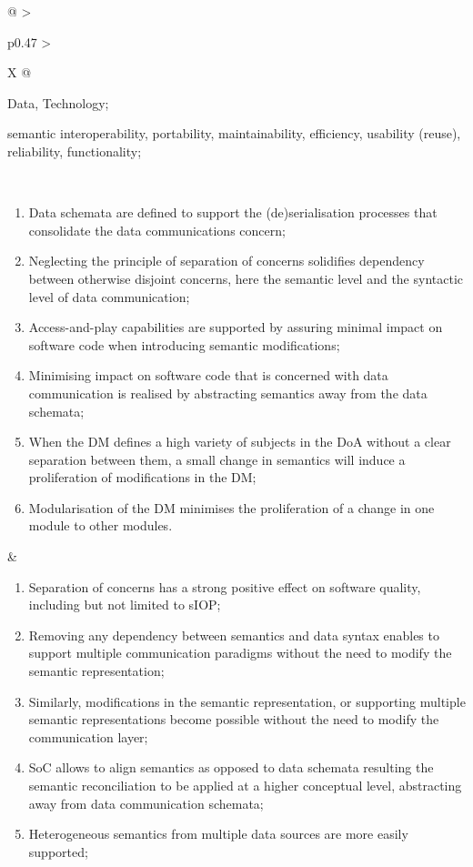\begin{xltabular}[l]{\linewidth}{@{} >{\small\raggedright\arraybackslash}p{0.47\linewidth} >{\small\raggedright\arraybackslash}X @{}}
\begin{description}[labelwidth=3.7cm,leftmargin=3.7cm+1ex,nosep,topsep=2ex,labelsep=1ex,font=\bfseries]
\item[Type of information:] Data, Technology;
\item[Quality attributes:] semantic interoperability, portability, maintainability, efficiency, usability (reuse), reliability, functionality;
\end{description}
\\
\begin{enumerate}[left=6pt, nosep]
  \item Data schemata are defined to support the (de)serialisation processes that consolidate the data communications concern;
  \item Neglecting the principle of separation of concerns solidifies dependency between otherwise disjoint concerns, here the semantic level and the syntactic level of data communication;
  \item Access-and-play capabilities are supported by assuring minimal impact on software code when introducing semantic modifications;
  \item Minimising impact on software code that is concerned with data communication is realised by abstracting semantics away from the data schemata;
  \item When the DM defines a high variety of subjects in the DoA without a clear separation between them, a small change in semantics will induce a proliferation of modifications in the DM;
  \item Modularisation of the DM minimises the proliferation of a change in one module to other modules.
\end{enumerate}
&
\begin{enumerate}[left=10pt, nosep]
  \item Separation of concerns has a strong positive effect on software quality, including but not limited to sIOP;
  \item Removing any dependency between semantics and data syntax enables to support multiple communication paradigms without the need to modify the semantic representation;
  \item Similarly, modifications in the semantic representation, or supporting multiple semantic representations become possible without the need to modify the communication layer;
  \item SoC allows to align semantics as opposed to data schemata resulting the semantic reconciliation to be applied at a higher conceptual level, abstracting away from data communication schemata;
  \item Heterogeneous semantics from multiple data sources are more easily supported;

\end{enumerate}
\end{xltabular}
